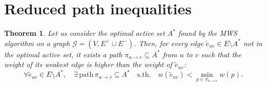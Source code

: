 \documentclass[12pt]{article}
\newtheorem{theorem}{Theorem}[section]
\begin{document}
\section{Reduced path inequalities}
\begin{theorem}
Let us consider the optimal active set $A^*$ found by the MWS algorithm on a graph $\mathcal{G} = (V, E^+ \cup E^-)$. Then, for every edge $\tilde{e}_{uv} \in E\setminus A^*$ not in the optimal active set, 
it exists a path $\pi_{u \rightarrow v}  \subseteq A^* $ from $u$ to $v$ such that the weight of its weakest edge is higher than the weight of $\tilde{e}_{uv}$:
\begin{equation}
\forall \tilde{e}_{uv} \in E\setminus A^*, \quad \exists \,\mathrm{path}\, \pi_{u \rightarrow v}  \subseteq A^* \quad \mathrm{s.th.} \quad w(\tilde{e}_{uv}) < \min_{p\in \pi_{u \rightarrow v}}  w(p). \label{eq:reduced_path_ineq}
\end{equation} 

\end{theorem}
\end{document}
